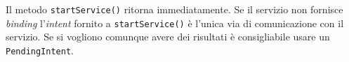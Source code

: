 Il metodo \texttt{startService()} ritorna immediatamente. Se il servizio non fornisce \textit{binding} l'\textit{intent} fornito a \texttt{startService()} è l'unica via di comunicazione con il servizio. Se si vogliono comunque avere dei risultati è consigliabile usare un \texttt{PendingIntent}.


















